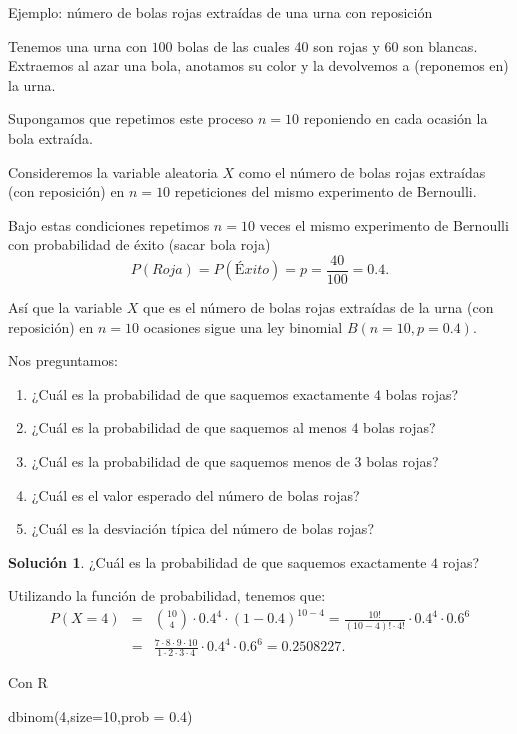 \documentclass[
  letterpaper,
  DIV=11,
  numbers=noendperiod]{scrreprt}
\newenvironment{Shaded}{\begin{snugshade}}{\end{snugshade}}
\newcommand{\AttributeTok}[1]{\textcolor[rgb]{0.40,0.45,0.13}{#1}}
\newcommand{\DecValTok}[1]{\textcolor[rgb]{0.68,0.00,0.00}{#1}}
\newcommand{\FloatTok}[1]{\textcolor[rgb]{0.68,0.00,0.00}{#1}}
\newcommand{\FunctionTok}[1]{\textcolor[rgb]{0.28,0.35,0.67}{#1}}
\newcommand{\NormalTok}[1]{\textcolor[rgb]{0.00,0.23,0.31}{#1}}
\providecommand{\tightlist}{%
  \setlength{\itemsep}{0pt}\setlength{\parskip}{0pt}}\usepackage{longtable,booktabs,array}
\begin{document}
\begin{Ejemplo}{Ejemplo: número de bolas rojas extraídas de una urna con reposición}{}

Tenemos una urna con \(100\) bolas de las cuales 40 son rojas y 60 son
blancas. Extraemos al azar una bola, anotamos su color y la devolvemos a
(reponemos en) la urna.

Supongamos que repetimos este proceso \(n=10\) reponiendo en cada
ocasión la bola extraída.

Consideremos la variable aleatoria \(X\) como el número de bolas rojas
extraídas (con reposición) en \(n=10\) repeticiones del mismo
experimento de Bernoulli.

Bajo estas condiciones repetimos \(n=10\) veces el mismo experimento de
Bernoulli con probabilidad de éxito (sacar bola roja)
\[P(Roja)=P(Éxito)=p=\frac{40}{100}=0.4.\]

Así que la variable \(X\) que es el número de bolas rojas extraídas de
la urna (con reposición) en \(n=10\) ocasiones sigue una ley binomial
\(B(n=10,p=0.4).\)

Nos preguntamos:

\begin{enumerate}
\def\labelenumi{\arabic{enumi}.}
\tightlist
\item
  ¿Cuál es la probabilidad de que saquemos exactamente \(4\) bolas
  rojas?
\item
  ¿Cuál es la probabilidad de que saquemos al menos \(4\) bolas rojas?
\item
  ¿Cuál es la probabilidad de que saquemos menos de \(3\) bolas rojas?
\item
  ¿Cuál es el valor esperado del número de bolas rojas?
\item
  ¿Cuál es la desviación típica del número de bolas rojas?
\end{enumerate}

\textbf{Solución 1}. ¿Cuál es la probabilidad de que saquemos
exactamente \(4\) rojas?

Utilizando la función de probabilidad, tenemos que: \begin{eqnarray*}
P(X=4)&=&{10\choose 4}\cdot 0.4^4\cdot (1-0.4)^{10-4}
= \frac{10!}{(10-4)!\cdot 4!}\cdot 0.4^4\cdot 0.6^6\\
&=& \frac{7\cdot 8\cdot 9\cdot 10}{1\cdot 2\cdot 3\cdot 4}\cdot 0.4^4\cdot 0.6^6=0.2508227.
\end{eqnarray*}

Con R

\begin{Shaded}
\begin{Highlighting}[]
\FunctionTok{dbinom}\NormalTok{(}\DecValTok{4}\NormalTok{,}\AttributeTok{size=}\DecValTok{10}\NormalTok{,}\AttributeTok{prob =} \FloatTok{0.4}\NormalTok{)}
\end{Highlighting}
\end{Shaded}


\end{Ejemplo}
\end{document}
